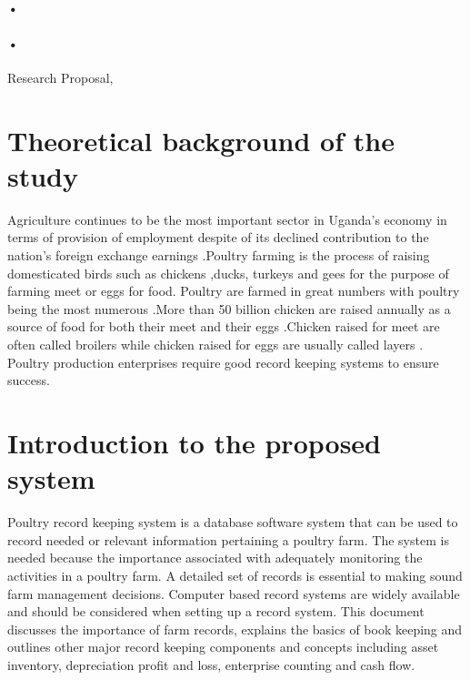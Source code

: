 \documentclass[12pt,]{article}
\begin{document}
\begin{titlepage}
\paragraph*{•}
\paragraph*{•}
  \begin{flushright}
  Research Proposal,\\
 
 \tableofcontents

  \end{flushright}
\date{\today}
\end{titlepage}

\newpage




\section{Theoretical background of the study}
Agriculture continues to be the most important sector in Uganda's economy
in terms of provision of employment despite of its declined contribution to the
nation's foreign exchange earnings .Poultry farming is the process of raising
domesticated birds such as chickens ,ducks, turkeys and gees for the purpose
of farming meet or eggs for food. Poultry are farmed in great numbers with
poultry being the most numerous .More than 50 billion chicken are raised
annually as a source of food for both their meet and their eggs .Chicken
raised for meet are often called broilers while chicken raised for eggs are
usually called layers . Poultry production enterprises require good record
keeping systems to ensure success.
\section{Introduction to the proposed system}
Poultry record keeping system is a database software system that can be
used to record needed or relevant information pertaining a poultry farm.
The system is needed because the importance associated with adequately
monitoring the activities in a poultry farm. A detailed set of records is
essential to making sound farm management decisions. Computer based
record systems are widely available and should be considered when setting
up a record system. This document discusses the importance of farm records,
explains the basics of book keeping and outlines other major record keeping
components and concepts including asset inventory, depreciation profit and
loss, enterprise counting and cash flow.
\end{document}
